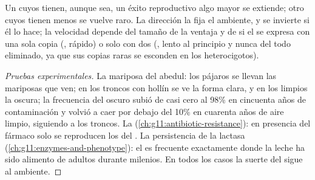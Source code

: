 \begin{proposition}\label{prop:g12:selection-drift-speciation:direction}
Un  cuyos  tienen, aunque sea, un éxito reproductivo
algo mayor se extiende; otro cuyos  tienen menos se vuelve
raro. La dirección la fija el ambiente, y se invierte si él lo hace; la
velocidad depende del tamaño de la ventaja y de si el  se expresa
con una sola copia (, rápido) o solo con dos (, lento
al principio y nunca del todo eliminado, ya que sus copias raras se
esconden en los heterocigotos).
\end{proposition}
\begin{proof}[Pruebas experimentales]
La mariposa del abedul: los pájaros se llevan las mariposas que ven; en
los troncos con hollín se ve la forma clara, y en los limpios la
oscura; la frecuencia del  oscuro subió de casi cero al 98\% en
cincuenta años de contaminación y volvió a caer por debajo del 10\% en
cuarenta años de aire limpio, siguiendo a los troncos. La  (\cref{ch:g11:antibiotic-resistance}): en presencia
del fármaco solo se reproducen los  del  . La
persistencia de la lactasa
(\cref{ch:g11:enzymes-and-phenotype}): el  es frecuente
exactamente donde la leche ha sido alimento de adultos durante
milenios. En todos los casos la suerte del  sigue al ambiente.
\end{proof}

